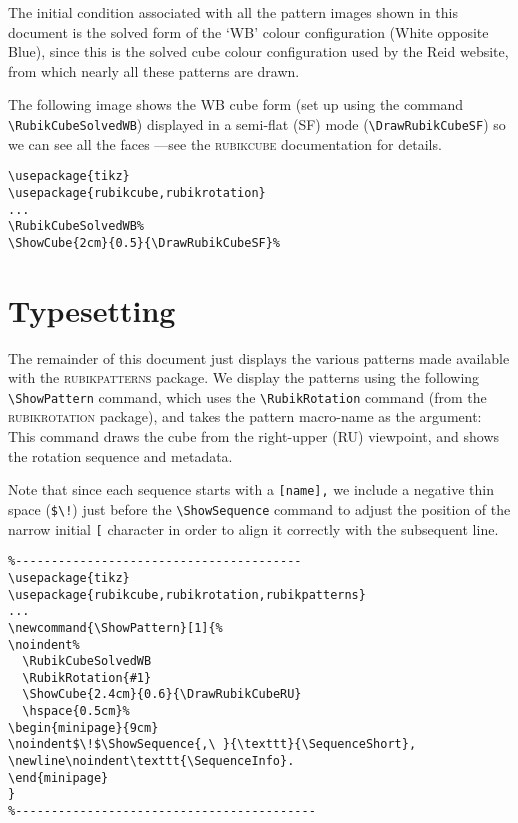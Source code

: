 \documentclass[a4paper]{article}
\newcommand{\ShowPattern}[1]{%
\noindent%
  \RubikCubeSolvedWB
  \RubikRotation{#1}
  \ShowCube{2.4cm}{0.6}{\DrawRubikCubeRU}
  \hspace{0.5cm}%
\begin{minipage}{9cm}
\noindent$\!$\ShowSequence{,\ }{\texttt}{\SequenceShort},
\newline\noindent\texttt{\SequenceInfo}.
\end{minipage}
}
\begin{document}
The initial condition   associated with all the pattern images 
shown in this document is the  solved form of the `WB' colour 
configuration (White opposite Blue), since this is the solved 
cube colour configuration used by the Reid website, from which 
nearly all these patterns are drawn.

The following image shows the WB cube form (set up using the command 
\verb!\RubikCubeSolvedWB!) displayed in a  semi-flat (SF) mode 
(\verb!\DrawRubikCubeSF!) so we can see all the faces 
---see the \textsc{rubikcube} documentation for details.

\bigskip

  \RubikCubeSolvedWB%
\hspace{3mm}%
\begin{minipage}{5cm}
\begin{verbatim}
\usepackage{tikz}
\usepackage{rubikcube,rubikrotation} 
...
\RubikCubeSolvedWB%
\ShowCube{2cm}{0.5}{\DrawRubikCubeSF}%
\end{verbatim}
\end{minipage}

\section{Typesetting}

The remainder of this document just  displays the various patterns 
made available  with the \textsc{rubikpatterns} package. We display 
the patterns using the following   \verb!\ShowPattern! command, which
uses the  \verb!\RubikRotation! command (from the  \textsc{rubikrotation} 
package), and  takes the pattern macro-name as the argument:
This command draws the cube from the right-upper (RU) viewpoint, 
and shows the rotation sequence and metadata.

Note that since each sequence starts with a \verb![name],! we include 
a negative thin space (\verb[$\![) just before the \verb!\ShowSequence! 
command to adjust the  position of the narrow initial \verb![! character 
 in order to align it correctly with the subsequent line.

\begin{verbatim}
%----------------------------------------
\usepackage{tikz}
\usepackage{rubikcube,rubikrotation,rubikpatterns} 
...
\newcommand{\ShowPattern}[1]{%
\noindent%
  \RubikCubeSolvedWB
  \RubikRotation{#1}
  \ShowCube{2.4cm}{0.6}{\DrawRubikCubeRU}
  \hspace{0.5cm}%
\begin{minipage}{9cm}
\noindent$\!$\ShowSequence{,\ }{\texttt}{\SequenceShort},
\newline\noindent\texttt{\SequenceInfo}.
\end{minipage}
}
%------------------------------------------
\end{verbatim}
\end{document}
